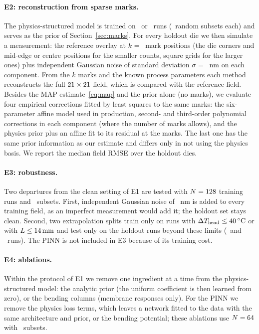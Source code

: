 \documentclass[11pt]{article}
\begin{document}
\paragraph{E2: reconstruction from sparse marks.} The physics-structured model is trained on \EtwoPriorSmall~or
\EtwoPriorLarge~runs (\EtwoReps~random subsets each) and serves as the prior of Section~\ref{sec:marks}. For every
holdout die we then simulate a measurement: the reference overlay at $k$ = \EtwoKs~mark positions (the die corners
and mid-edge or centre positions for the smaller counts, square grids for the larger ones) plus independent Gaussian
noise of standard deviation $\sigma$ = \EtwoNoises~nm on each component. From the $k$ marks and the known process
parameters each method reconstructs the full $21\times21$ field, which is compared with the reference field.
Besides the MAP estimate~\eqref{eq:map} and the prior alone (no marks), we evaluate four empirical corrections fitted
by least squares to the same marks: the six-parameter affine model used in production, second- and third-order
polynomial corrections in each component (where the number of marks allows), and the physics prior plus an affine fit
to its residual at the marks. The last one has the same prior information as our estimate and differs only in not
using the physics basis. We report the median field RMSE over the holdout dies.

\paragraph{E3: robustness.} Two departures from the clean setting of E1 are tested with $N=128$ training runs
and \EthreeReps~subsets. First, independent Gaussian noise of \EthreeNoises~nm is added to every training field, as an
imperfect measurement would add it; the holdout set stays clean. Second, two extrapolation splits train only on runs
with $\Delta T_{\mathrm{head}}\le\SI{40}{\celsius}$ or with $L\le\SI{14}{\milli\meter}$
and test only on the holdout runs beyond these limits (\EthreeOodDTNTest~and \EthreeOodLNTest~runs). The PINN is not
included in E3 because of its training cost.

\paragraph{E4: ablations.} Within the protocol of E1 we remove one ingredient at a time from the physics-structured
model: the analytic prior (the uniform coefficient is then learned from zero), or the bending columns (membrane
responses only). For the PINN we remove the physics loss terms, which leaves a network fitted to the data with the
same architecture and prior, or the bending potential; these ablations use $N=64$ with
\PinnAblationReps~subsets.
\end{document}
